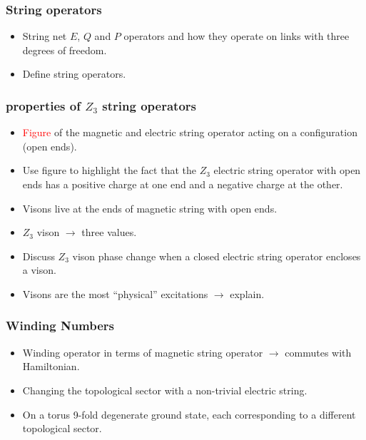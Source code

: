 \documentclass[aps,floatfix,11pt]{revtex4-1}
\begin{document}
        \subsubsection{String operators}
            \begin{itemize}
                \item String net $E$, $Q$ and $P$ operators and how they operate on links with three degrees of
                    freedom.
                \item Define string operators.
            \end{itemize}
    
        \subsubsection{properties of $Z_3$ string operators}
            \begin{itemize}
                \item \textcolor{red}{Figure} of the magnetic and electric string operator 
                    acting on a configuration (open ends).
                \item Use figure to highlight the fact that the $Z_3$ electric string operator with open ends
                    has a positive charge at one end and a negative charge at the other.
                \item Visons live at the ends of magnetic string with open ends.
                \item $Z_3$ vison $\rightarrow$ three values.
                \item Discuss $Z_3$ vison phase change when a closed electric string operator encloses a vison.
                \item Visons are the most ``physical'' excitations $\rightarrow$ explain. 
            \end{itemize}

        \subsubsection{Winding Numbers}
                \begin{itemize}
                    \item Winding operator in terms of magnetic string operator $\rightarrow$ commutes
                        with Hamiltonian.
                    \item Changing the topological sector with a non-trivial electric
                        string.
                    \item On a torus 9-fold degenerate ground state, each corresponding to a
                        different topological sector.
                \end{itemize}
\end{document}
